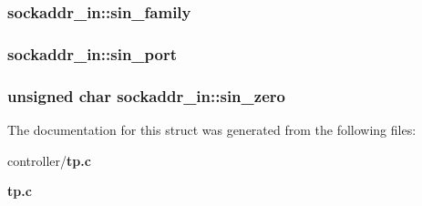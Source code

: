 \subsubsection[{sin\_\-family}]{ {\bf sockaddr\_\-in::sin\_\-family}}\label{structsockaddr__in_a9a7d98bb8e18f4a06a021c32d6cc7117}
\subsubsection[{sin\_\-port}]{ {\bf sockaddr\_\-in::sin\_\-port}}\label{structsockaddr__in_ae89eef5c2b45ce0a177379755edecafa}
\subsubsection[{sin\_\-zero}]{\setlength{\rightskip}{0pt plus 5cm}unsigned char {\bf sockaddr\_\-in::sin\_\-zero}}\label{structsockaddr__in_ae1ceb807e3813f7f875a05822f48782d}


The documentation for this struct was generated from the following files:\begin{DoxyCompactItemize}
\item 
controller/{\bf tp.c}\item 
{\bf tp.c}\end{DoxyCompactItemize}
